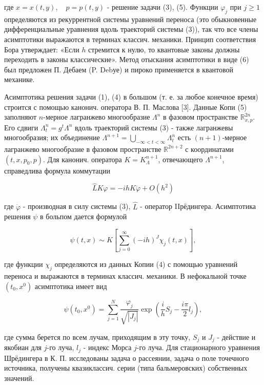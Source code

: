 \documentclass[10pt]{article}
\begin{document}
где $x=x(t, y), \quad p=p(t, y)$ - решение задачи (3), (5). Функции $\varphi_{j}$ при $j \geqslant 1$ определяются из рекуррентной системы уравнений переноса (это обыкновенные дифференциальные уравнения вдоль траекторий системы (3)), так что все члены асимптотики выражаются в терминах классич. механики. Принцип соответствия Бора утверждает: «Если $h$ стремится к нулю, то квантовые законы должны переходить в законы классические». Метод отыскания асимптотики в виде (6) был предложен П. Дебаем (P. Debуе) и пироко применяется в квантовой механике.



Асимптотика решения задачи (1), (4) в большом (т. е. за любое конечное время) строится с помощью канонич. оператора В. П. Маслова [3]. Данные Копи (5) заполняют $n$-мерное лагранжево многообразие $\Lambda^{n}$ в фазовом пространстве $\mathbb{R}_{x, p}^{2 n}$. Его сдвиги $\Lambda_{t}^{n}=g^{t} \Lambda^{n}$ вдоль траекторий системы (3) - также лагранжевы многообразия; их объединение $\Lambda^{n+1}=\bigcup_{-\infty<t<\infty} \Lambda_{t}^{n}$ есть $(n+1)$-мерное лагранжево многообразие в фазовом пространстве $\mathbb{R}^{2 n+2}$ с координатами $\left(t, x, p_{0}, p\right)$. Для канонич. оператора $K=K_{\Lambda}^{n+1}$, отвечающего $\Lambda^{n+1}$, справедлива формула коммутации



\[

\widehat{L} K \varphi=-i h K \dot{\varphi}+O\left(h^{2}\right)

\]



где $\dot{\varphi}$ - производная в силу системы (3), $\hat{L}$ - оператор IIрёдингера. Асимптотика решения $\psi$ в больпом дается формулой



\[

\psi(t, x) \sim K\left[\sum_{j=0}^{\infty}(-i h)^{J} \chi_{j}(t, x)\right],

\]



где функции $\chi_{j}$ определяются из данных Копии (4) с помощью уравнений переноса и выражаются в терминах классич. механики. В нефокальной точке $\left(t_{0}, x^{0}\right)$ асимптотика имеет вид



\[

\psi\left(t_{0}, x^{0}\right)=\sum_{j=1}^{N} \frac{\varphi_{j}}{\sqrt{\left|J_{j}\right|}} \exp \left(\frac{i}{h} S_{j}-\frac{i \pi}{2} l_{j}\right),

\]



где сумма берется по всем лучам, приходящим в эту точку, $S_{j}$ и $J_{j}$ - действие и якобиан для $j$-го луча, $l_{j}$ - индекс Морса $j$-го луча. Для стационарного уравнения Шрёдингера в К. П. исследованы задача о рассеянии, задача о поле точечного источника, получены квазиклассич. серии (типа бальмеровских) собственных значений.
\end{document}
